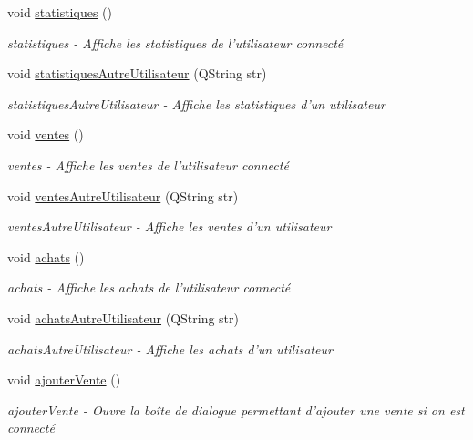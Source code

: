 \begin{DoxyCompactItemize}
void \hyperlink{class_ma_fenetre_abdebcc3a608ba960f92d9c33198afa8e}{statistiques} ()
\begin{DoxyCompactList}\small\item\em statistiques -\/ Affiche les statistiques de l'utilisateur connecté \end{DoxyCompactList}\item 
void \hyperlink{class_ma_fenetre_a001780a069e034521e7669382d7eb5e1}{statistiques\-Autre\-Utilisateur} (Q\-String str)
\begin{DoxyCompactList}\small\item\em statistiques\-Autre\-Utilisateur -\/ Affiche les statistiques d'un utilisateur \end{DoxyCompactList}\item 
void \hyperlink{class_ma_fenetre_ae0699859505bac920f9cb033ddb1da23}{ventes} ()
\begin{DoxyCompactList}\small\item\em ventes -\/ Affiche les ventes de l'utilisateur connecté \end{DoxyCompactList}\item 
void \hyperlink{class_ma_fenetre_acf4ee6e1091a054e5401c9b9b00fcb41}{ventes\-Autre\-Utilisateur} (Q\-String str)
\begin{DoxyCompactList}\small\item\em ventes\-Autre\-Utilisateur -\/ Affiche les ventes d'un utilisateur \end{DoxyCompactList}\item 
void \hyperlink{class_ma_fenetre_a48f619e7d913b0e969273be7435b9ab5}{achats} ()
\begin{DoxyCompactList}\small\item\em achats -\/ Affiche les achats de l'utilisateur connecté \end{DoxyCompactList}\item 
void \hyperlink{class_ma_fenetre_ac384e90a833894bec8d4552659e90c31}{achats\-Autre\-Utilisateur} (Q\-String str)
\begin{DoxyCompactList}\small\item\em achats\-Autre\-Utilisateur -\/ Affiche les achats d'un utilisateur \end{DoxyCompactList}\item 
void \hyperlink{class_ma_fenetre_abd8cb1d6b536873f3d369457073270c4}{ajouter\-Vente} ()
\begin{DoxyCompactList}\small\item\em ajouter\-Vente -\/ Ouvre la boîte de dialogue permettant d'ajouter une vente si on est connecté \end{DoxyCompactList}\item 

\end{DoxyCompactItemize}
